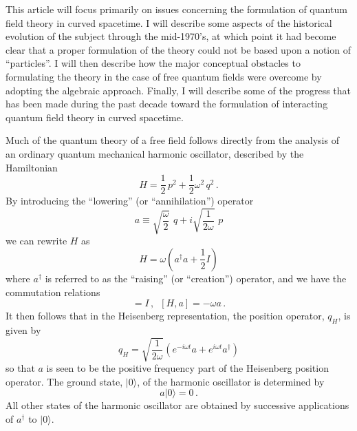 This article will focus primarily on issues concerning the formulation
of quantum field theory in curved spacetime. I will describe some
aspects of the historical evolution of the subject through the
mid-1970's, at which point it had become clear that a proper
formulation of the theory could not be based upon a notion of
``particles''. I will then describe how the major conceptual obstacles
to formulating the theory in the case of free quantum fields were
overcome by adopting the algebraic approach. Finally, I will describe some
of the progress that has been made during the past decade toward the
formulation of interacting quantum field theory in curved spacetime.

Much of the quantum theory of a free field follows directly from the
analysis of an ordinary quantum mechanical harmonic oscillator,
described by the Hamiltonian
\begin{equation}
H = \frac{1}{2} \, p^2 + \frac{1}{2} \omega^2 \, q^2 \, .
\end{equation}
By introducing the ``lowering'' (or ``annihilation'') operator
\begin{equation}
a \equiv \sqrt{\frac{\omega}{2}} \,\, q + i \sqrt{\frac{1}{2\omega}} \,\, p
\end{equation}
we can rewrite $H$ as
\begin{equation}
H = \omega (a^\dagger a + \frac{1}{2} I)
\end{equation}
where $a^\dagger$ is referred to as the ``raising'' (or ``creation'')
operator, and we have the commutation relations 
\begin{equation}
[a, a^\dagger] = I \, , \,\,\, [H,a] = - \omega a \, .
\end{equation}
It then follows that in the Heisenberg representation, the position
operator, $q_H$, is given by
\begin{equation}
q_H = \sqrt{\frac{1}{2\omega}} \left(e^{-i\omega t} a 
+ e^{i\omega t} a^\dagger \right)
\end{equation}
so that $a$ is seen to be the positive frequency part of the
Heisenberg position operator. The ground state, $|0 \rangle$, of the harmonic
oscillator is determined by
\begin{equation}
a |0 \rangle = 0 \, .
\end{equation}
All other states of the harmonic oscillator are obtained by successive
applications of $a^\dagger$ to $|0 \rangle$.

